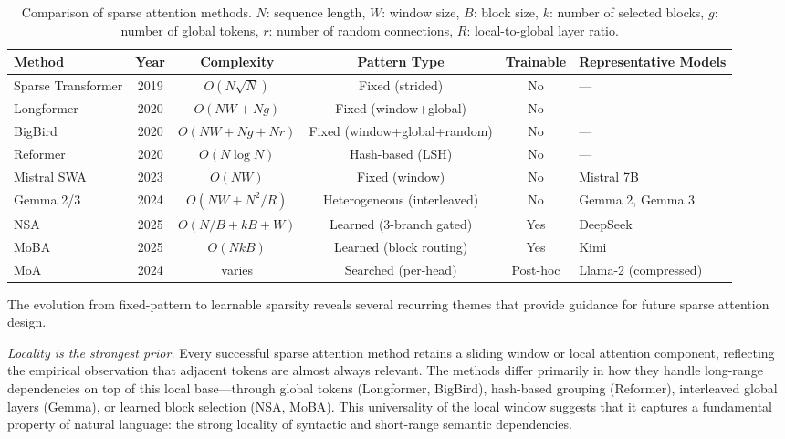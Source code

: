\begin{table}[t]
\centering
\caption{Comparison of sparse attention methods. $N$: sequence length, $W$: window size, $B$: block size, $k$: number of selected blocks, $g$: number of global tokens, $r$: number of random connections, $R$: local-to-global layer ratio.}
\label{tab:sparse-attn-comparison}
\small
\begin{tabular}{lccccl}
\toprule
\textbf{Method} & \textbf{Year} & \textbf{Complexity} & \textbf{Pattern Type} & \textbf{Trainable} & \textbf{Representative Models} \\
\midrule
Sparse Transformer & 2019 & $O(N\sqrt{N})$ & Fixed (strided) & No & --- \\
Longformer         & 2020 & $O(NW + Ng)$   & Fixed (window+global) & No & --- \\
BigBird            & 2020 & $O(NW + Ng + Nr)$ & Fixed (window+global+random) & No & --- \\
Reformer           & 2020 & $O(N \log N)$  & Hash-based (LSH) & No & --- \\
Mistral SWA        & 2023 & $O(NW)$        & Fixed (window) & No & Mistral 7B \\
Gemma 2/3          & 2024 & $O(NW + N^2/R)$ & Heterogeneous (interleaved) & No & Gemma 2, Gemma 3 \\
NSA                & 2025 & $O(N/B{+}kB{+}W)$ & Learned (3-branch gated) & Yes & DeepSeek \\
MoBA               & 2025 & $O(NkB)$       & Learned (block routing) & Yes & Kimi \\
MoA                & 2024 & varies         & Searched (per-head) & Post-hoc & Llama-2 (compressed) \\
\bottomrule
\end{tabular}
\end{table}

The evolution from fixed-pattern to learnable sparsity reveals several recurring themes that provide guidance for future sparse attention design.

\emph{Locality is the strongest prior.} Every successful sparse attention method retains a sliding window or local attention component, reflecting the empirical observation that adjacent tokens are almost always relevant. The methods differ primarily in how they handle long-range dependencies on top of this local base---through global tokens (Longformer, BigBird), hash-based grouping (Reformer), interleaved global layers (Gemma), or learned block selection (NSA, MoBA). This universality of the local window suggests that it captures a fundamental property of natural language: the strong locality of syntactic and short-range semantic dependencies.


